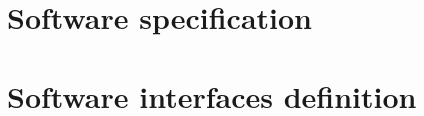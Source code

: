 %
\section{Software specification}
\label{sec:sw-specs}
% 
% 
% 
% 
\section{Software interfaces definition}
\label{sec:sw-interf-def}
%
% 

